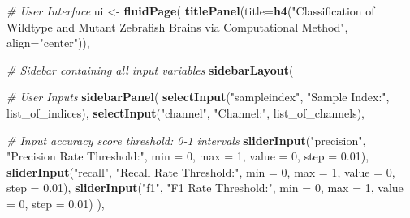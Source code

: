\documentclass[10pt,letterpaper]{article}
\newenvironment{Shaded}{\begin{snugshade}}{\end{snugshade}}
\newcommand{\KeywordTok}[1]{\textcolor[rgb]{0.13,0.29,0.53}{\textbf{{#1}}}}
\newcommand{\DataTypeTok}[1]{\textcolor[rgb]{0.13,0.29,0.53}{{#1}}}
\newcommand{\DecValTok}[1]{\textcolor[rgb]{0.00,0.00,0.81}{{#1}}}
\newcommand{\FloatTok}[1]{\textcolor[rgb]{0.00,0.00,0.81}{{#1}}}
\newcommand{\StringTok}[1]{\textcolor[rgb]{0.31,0.60,0.02}{{#1}}}
\newcommand{\CommentTok}[1]{\textcolor[rgb]{0.56,0.35,0.01}{\textit{{#1}}}}
\newcommand{\NormalTok}[1]{{#1}}
\begin{document}
\begin{Shaded}
\begin{Highlighting}[]
\CommentTok{# User Interface}
\NormalTok{ui <-}\StringTok{ }\KeywordTok{fluidPage}\NormalTok{(}
  \KeywordTok{titlePanel}\NormalTok{(}\DataTypeTok{title=}\KeywordTok{h4}\NormalTok{(}\StringTok{"Classification of Wildtype and Mutant }
\StringTok{                      Zebrafish Brains via Computational Method"}\NormalTok{, }
                      \DataTypeTok{align=}\StringTok{"center"}\NormalTok{)),}
  
  \CommentTok{# Sidebar containing all input variables}
  \KeywordTok{sidebarLayout}\NormalTok{(}
    
    \CommentTok{# User Inputs}
    \KeywordTok{sidebarPanel}\NormalTok{(}
      \KeywordTok{selectInput}\NormalTok{(}\StringTok{"sampleindex"}\NormalTok{, }\StringTok{"Sample Index:"}\NormalTok{, list_of_indices),}
      \KeywordTok{selectInput}\NormalTok{(}\StringTok{"channel"}\NormalTok{, }\StringTok{"Channel:"}\NormalTok{, list_of_channels),}
      
      \CommentTok{# Input accuracy score threshold: 0-1 intervals}
      \KeywordTok{sliderInput}\NormalTok{(}\StringTok{"precision"}\NormalTok{, }\StringTok{"Precision Rate Threshold:"}\NormalTok{,}
                  \DataTypeTok{min =} \DecValTok{0}\NormalTok{, }\DataTypeTok{max =} \DecValTok{1}\NormalTok{,}
                  \DataTypeTok{value =} \DecValTok{0}\NormalTok{, }\DataTypeTok{step =} \FloatTok{0.01}\NormalTok{),}
      \KeywordTok{sliderInput}\NormalTok{(}\StringTok{"recall"}\NormalTok{, }\StringTok{"Recall Rate Threshold:"}\NormalTok{,}
                  \DataTypeTok{min =} \DecValTok{0}\NormalTok{, }\DataTypeTok{max =} \DecValTok{1}\NormalTok{,}
                  \DataTypeTok{value =} \DecValTok{0}\NormalTok{, }\DataTypeTok{step =} \FloatTok{0.01}\NormalTok{),}
      \KeywordTok{sliderInput}\NormalTok{(}\StringTok{"f1"}\NormalTok{, }\StringTok{"F1 Rate Threshold:"}\NormalTok{,}
                  \DataTypeTok{min =} \DecValTok{0}\NormalTok{, }\DataTypeTok{max =} \DecValTok{1}\NormalTok{,}
                  \DataTypeTok{value =} \DecValTok{0}\NormalTok{, }\DataTypeTok{step =} \FloatTok{0.01}\NormalTok{)}
    \NormalTok{),}
    

\end{Highlighting}
\end{Shaded}
\end{document}
